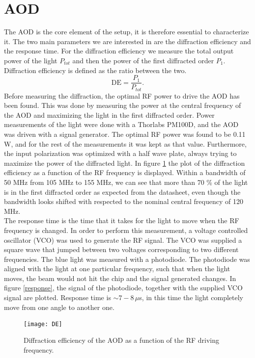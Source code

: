 \section{AOD}
The AOD is the core element of the setup, it is therefore essential to characterize it. The two main parameters we are interested in are the diffraction efficiency and the response time. For the diffraction efficiency we measure the total output power of the light $P_{tot}$ and then the power of the first diffracted order $P_{1}$. Diffraction efficiency is defined as the ratio between the two.
\begin{equation}
\text{DE} = \frac{P_1}{P_{tot}}.
\end{equation}
Before measuring the diffraction, the optimal RF power to drive the AOD has been found. This was done by measuring the power at the central frequency of the AOD and maximizing the light in the first diffracted order. Power measurements of the light were done with a Thorlabs PM100D, and the AOD was driven with a signal generator. The optimal RF power was found to be 0.11 W, and for the rest of the measurements it was kept as that value. Furthermore, the input polarization was optimized with a half wave plate, always trying to maximize the power of the diffracted light. In figure \ref{DE} the plot of the diffraction efficiency as a function of the RF frequency is displayed. Within a bandwidth of 50 MHz from 105 MHz to 155 MHz, we can see that more than 70 \% of the light is in the first diffracted order as expected from the datasheet, even though the bandwidth looks shifted with respected to the nominal central frequency of 120 MHz.\\
The response time is the time that it takes for the light to move when the RF frequency is changed. In order to perform this measurement, a voltage controlled oscillator (VCO) was used to generate the RF signal. The VCO was supplied a square wave that jumped between two voltages corresponding to two different frequencies. The blue light was measured with a photodiode. The photodiode was aligned with the light at one particular frequency, such that when the light moves, the beam would not hit the chip and the signal generated changes. In figure \ref{response}, the signal of the photodiode, together with the supplied VCO signal are plotted. Response time is $\sim 7-8\,\mu$s, in this time the light completely move from one angle to another one.

\begin{figure}
\centering
\texttt{[image: DE]}
\caption{Diffraction efficiency of the AOD as a function of the RF driving frequency.}
\label{DE}
\end{figure}


